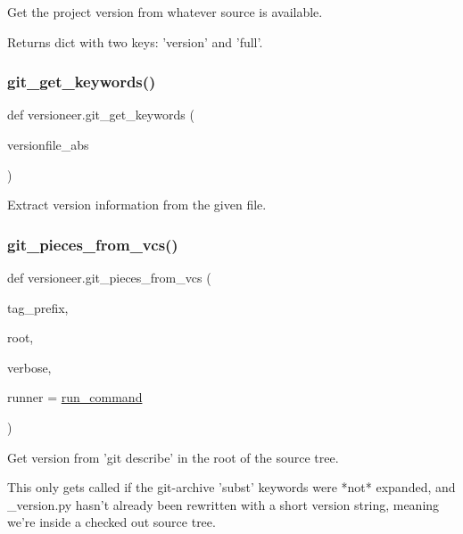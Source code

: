 \begin{DoxyVerb}Get the project version from whatever source is available.

Returns dict with two keys: 'version' and 'full'.
\end{DoxyVerb}
 \mbox{\label{namespaceversioneer_ad2a709a90be7e4f03fb64ec28c9cad89}} 
\subsubsection{\texorpdfstring{git\+\_\+get\+\_\+keywords()}{git\_get\_keywords()}}
{\footnotesize\ttfamily def versioneer.\+git\+\_\+get\+\_\+keywords (\begin{DoxyParamCaption}\item[{}]{versionfile\+\_\+abs }\end{DoxyParamCaption})}

\begin{DoxyVerb}Extract version information from the given file.\end{DoxyVerb}
 \mbox{\label{namespaceversioneer_a6e36c114ba80f100db2b81427ce08dd2}} 
\subsubsection{\texorpdfstring{git\+\_\+pieces\+\_\+from\+\_\+vcs()}{git\_pieces\_from\_vcs()}}
{\footnotesize\ttfamily def versioneer.\+git\+\_\+pieces\+\_\+from\+\_\+vcs (\begin{DoxyParamCaption}\item[{}]{tag\+\_\+prefix,  }\item[{}]{root,  }\item[{}]{verbose,  }\item[{}]{runner = {\ttfamily \hyperlink{namespaceversioneer_a89717690f70ee308e16baf071b4b81da}{run\+\_\+command}} }\end{DoxyParamCaption})}

\begin{DoxyVerb}Get version from 'git describe' in the root of the source tree.

This only gets called if the git-archive 'subst' keywords were *not*
expanded, and _version.py hasn't already been rewritten with a short
version string, meaning we're inside a checked out source tree.
\end{DoxyVerb}
 \mbox{\label{namespaceversioneer_a7db6b5bc705d0a8348c3e232df1d900d}} 
